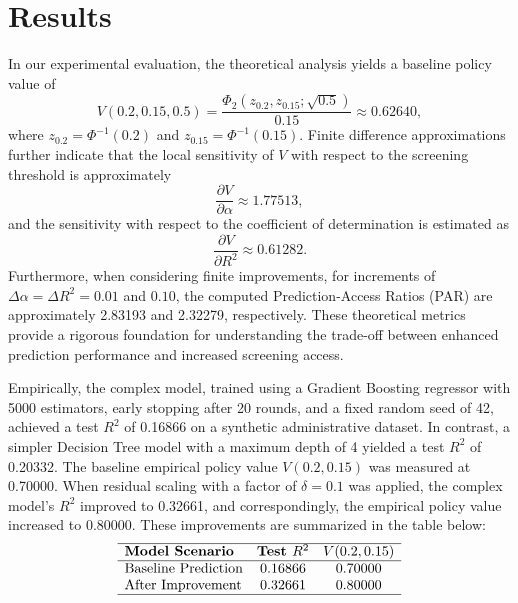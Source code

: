 \documentclass{article} %
\begin{document}
\section{Results}
In our experimental evaluation, the theoretical analysis yields a baseline policy value of 
\[
V(0.2,0.15,0.5)=\frac{\Phi_2(z_{0.2},z_{0.15};\sqrt{0.5})}{0.15} \approx 0.62640,
\]
where \(z_{0.2}=\Phi^{-1}(0.2)\) and \(z_{0.15}=\Phi^{-1}(0.15)\). Finite difference approximations further indicate that the local sensitivity of \(V\) with respect to the screening threshold is approximately 
\[
\frac{\partial V}{\partial \alpha}\approx1.77513,
\]
and the sensitivity with respect to the coefficient of determination is estimated as 
\[
\frac{\partial V}{\partial R^2}\approx0.61282.
\]
Furthermore, when considering finite improvements, for increments of \(\Delta\alpha=\Delta R^2=0.01\) and \(0.10\), the computed Prediction-Access Ratios (PAR) are approximately 2.83193 and 2.32279, respectively. These theoretical metrics provide a rigorous foundation for understanding the trade-off between enhanced prediction performance and increased screening access.

Empirically, the complex model, trained using a Gradient Boosting regressor with 5000 estimators, early stopping after 20 rounds, and a fixed random seed of 42, achieved a test \(R^2\) of 0.16866 on a synthetic administrative dataset. In contrast, a simpler Decision Tree model with a maximum depth of 4 yielded a test \(R^2\) of 0.20332. The baseline empirical policy value \(V(0.2,0.15)\) was measured at 0.70000. When residual scaling with a factor of \(\delta=0.1\) was applied, the complex model's \(R^2\) improved to 0.32661, and correspondingly, the empirical policy value increased to 0.80000. These improvements are summarized in the table below:
\[
\begin{array}{lcc}
\hline
\textbf{Model Scenario} & \textbf{Test } R^2 & V(0.2,0.15) \\
\hline
\text{Baseline Prediction} & 0.16866 & 0.70000 \\
\text{After Improvement} & 0.32661 & 0.80000 \\
\hline
\end{array}
\]
\end{document}
